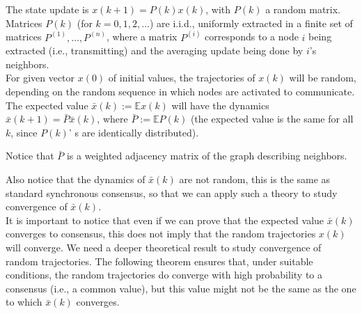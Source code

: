 \documentclass[oneside]{article}
\begin{document}
The state update is $x(k+1) = P(k) x(k)$, with $P(k)$ a random matrix. Matrices $P(k)$ (for $k=0,1,2,\dots$) are i.i.d., uniformly extracted in a finite set of matrices $P^{(1)}, \dots, P^{(n)}$,  where a matrix $P^{(i)}$ corresponds to a node $i$ being extracted (i.e., transmitting) and the averaging update being done by $i$'s neighbors.\\


For given vector $x(0)$ of initial values, the trajectories of $x(k)$  will be random, depending on the random sequence in which nodes are activated to communicate. The expected value $\bar x(k) := \mathbb E x(k)$ will have the dynamics $\bar x(k+1) = \bar P \bar x(k)$, where $\bar P := \mathbb E P(k)$ (the expected value is the same for all $k$, since $P(k)$' s are identically distributed).

Notice that $\bar P$ is a weighted adjacency matrix of the graph describing neighbors.

Also notice that the dynamics of $\bar x(k)$ are not random, this is the same as standard synchronous consensus, so that we can apply such a theory to study convergence of $\bar x(k)$.\\






It is important to notice that even if we can prove that the expected value $\bar x(k)$ converges to consensus, this does not imply that the random trajectories $x(k)$ will converge.
We need a deeper theoretical result to study convergence of random trajectories. The following theorem ensures that, under suitable conditions, the random trajectories do converge with high probability to a consensus (i.e., a common value), but this value might not be the same as the one to which $\bar x(k)$ converges.\\
\end{document}
